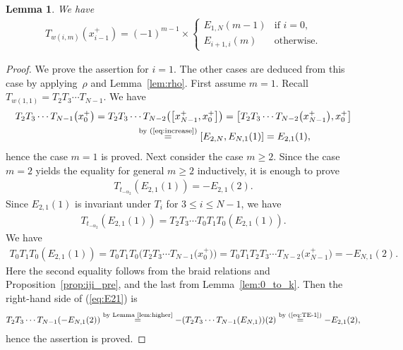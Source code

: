 \documentclass[10pt,a4paper]{amsart}
\newtheorem{lem}[thm]{Lemma}
\theoremstyle{definition}
\numberwithin{equation}{section}
\begin{document}
\begin{lem}\label{lem:classical_part} We have
\begin{gather*} T_{w(i,m)}(x_{i-1}^+) = (-1)^{m-1} \times \begin{cases}
E_{1,N}(m-1) & \text{if $i=0$},\\
E_{i+1,i}(m) & \text{otherwise}.
\end{cases}
\end{gather*}
\end{lem}
\begin{proof}We prove the assertion for $i=1$. The other cases are deduced from this case by applying~$\rho$ and Lemma~\ref{lem:rho}. First assume $m=1$. Recall $T_{w(1,1)}=T_2 T_3 \cdots T_{N-1}$. We have
\begin{gather*}
T_2 T_3 \cdots T_{N-1}\big(x_0^+\big) = T_2 T_3 \cdots T_{N-2} \big(\big[x_{N-1}^+,x_0^+\big]\big) = \big[T_2 T_3 \cdots T_{N-2} \big(x_{N-1}^+\big),x_0^+\big] \\
\hphantom{T_2 T_3 \cdots T_{N-1}\big(x_0^+\big)}{} \overset{\text{by (\ref{eq:increase})}}{=} [E_{2,N}, E_{N,1}(1)] = E_{2,1}(1),
\end{gather*}
hence the case $m=1$ is proved. Next consider the case $m \geq 2$. Since the case $m=2$ yields the equality for general $m \geq 2$ inductively, it is enough to prove
\begin{gather*}
T_{t_{-\alpha_2}}(E_{2,1}(1))=-E_{2,1}(2).
\end{gather*}
Since $E_{2,1}(1)$ is invariant under $T_i$ for $3 \leq i \leq N-1$, we have
\begin{gather}
T_{t_{-\alpha_2}}(E_{2,1}(1)) = T_2 T_3 \cdots T_0 T_1 T_0 (E_{2,1}(1)).\label{eq:E21}
\end{gather}
We have
\begin{gather*}
T_0 T_1 T_0 (E_{2,1}(1)) = T_0 T_1 T_0 \big(T_2 T_3 \cdots T_{N-1}\big(x_0^+\big)\big) = T_0 T_1 T_2 T_3 \cdots T_{N-2}\big(x_{N-1}^+\big) = -E_{N,1}(2).
\end{gather*}
Here the second equality follows from the braid relations and Proposition~\ref{prop:iji_pre}, and the last from Lemma~\ref{lem:0_to_k}. Then the right-hand side of (\ref{eq:E21}) is
\begin{gather*}
T_2 T_3 \cdots T_{N-1} (-E_{N,1}(2)) \overset{\text{by Lemma~\ref{lem:higher}}}{=} - (T_2 T_3 \cdots T_{N-1} (E_{N,1}) )(2) \overset{\text{by (\ref{eq:TE-1})}}{=} -E_{2,1}(2),
\end{gather*}
hence the assertion is proved.
\end{proof}
\end{document}
